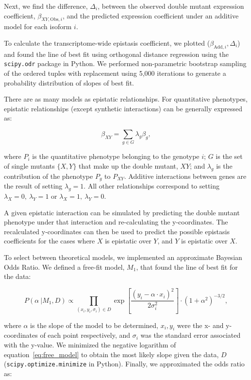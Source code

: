 \documentclass[10pt, onecolumn]{article}
\begin{document}
Next, we find the difference, $\Delta_i$, between the observed double mutant
expression coefficient, $\beta_{XY, \mathrm{Obs},i}$, and the predicted
expression coefficient under an additive model for each isoform $i$.

To calculate the transcriptome-wide epistasis coefficient, we plotted
($\beta_{\mathrm{Add},i}, \Delta_i$) and found the line of best fit using
orthogonal distance regression using the \texttt{scipy.odr} package in Python.
We performed
non-parametric bootstrap sampling of the ordered tuples with replacement using
5,000 iterations to generate a probability distribution of slopes of best fit.

There are as many models as epistatic relationships. For quantitative phenotypes,
epistatic relationships (except synthetic interactions) can be generally
expressed as:

\begin{equation}
  \beta_{XY} = \sum_{g\in G} \lambda_g \beta_g,
  \label{eq:epi}
\end{equation}

where $P_i$ is the quantitative phenotype belonging to the genotype $i$; $G$ is
the set of single mutants $\{X, Y\}$ that make up the double mutant, $XY$; and
$\lambda_g$ is the contribution of the phenotype $P_g$ to $P_{XY}$.
Additive interactions between genes are the result of setting $\lambda_g=1$. All
other relationships correspond to setting  $\lambda_X=0,~\lambda_Y=1$ or
$\lambda_X=1,~\lambda_Y=0$.

A given epistatic interaction can be simulated by predicting the double mutant
phenotype under that interaction and re-calculating the y-coordinates. The
recalculated y-coordinates can then be used to predict the possible epistasis
coefficients for the cases where $X$ is epistatic over $Y$, and $Y$ is epistatic
over $X$.

To select between theoretical models, we implemented an approximate Bayesian
Odds Ratio. We defined a free-fit model, $M_1$, that found the line of best fit
for the data:

\begin{equation}
  P(\alpha~|M_1, D) \propto \prod_{(x_i, y_i, \sigma_i)\in D}
  \exp{
       [\frac{{(y_i - \alpha\cdot x_i)}^2} %
            {2\sigma_i^2}] %
      } \cdot {(1+\alpha^2)}^{-3/2},
  \label{eq:free_model}
\end{equation}

where $\alpha$ is the slope of the model to be determined, $x_i, y_i$ were the
x- and y-coordinates of each point respectively, and $\sigma_i$ was the standard
error associated with the y-value. We minimized the
negative logarithm of equation~\ref{eq:free_model} to obtain the most likely
slope given the data, $D$ (\texttt{scipy.optimize.minimize} in Python). Finally,
we approximated the odds ratio as:
\end{document}
